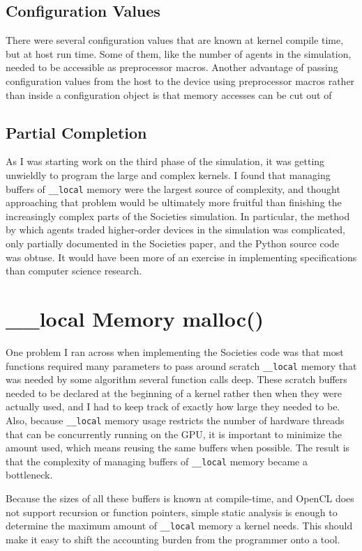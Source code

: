 \documentclass{article}
\begin{document}
\subsection{Configuration Values}
There were several configuration values that are known at kernel compile time, but at host run time. Some of them, like the number of agents in the simulation, needed to be accessible as preprocessor macros. Another advantage of passing configuration values from the host to the device using preprocessor macros rather than inside a configuration object is that memory accesses can be cut out of 

\subsection{Partial Completion}
As I was starting work on the third phase of the simulation, it was getting unwieldly to program the large and complex kernels. I found that managing buffers of \texttt{\_\_local} memory were the largest source of complexity, and thought approaching that problem would be ultimately more fruitful than finishing the increasingly complex parts of the Societies simulation. In particular, the method by which agents traded higher-order devices in the simulation was complicated, only partially documented in the Societies paper, and the Python source code was obtuse. It would have been more of an exercise in implementing specifications than computer science research.

\section{\_\_local Memory malloc()}
One problem I ran across when implementing the Societies code was that most functions required many parameters to pass around scratch \texttt{\_\_local} memory that was needed by some algorithm several function calls deep. These scratch buffers needed to be declared at the beginning of a kernel rather then when they were actually used, and I had to keep track of exactly how large they needed to be. Also, because \texttt{\_\_local} memory usage restricts the number of hardware threads that can be concurrently running on the GPU, it is important to minimize the amount used, which means reusing the same buffers when possible. The result is that the complexity of managing buffers of \texttt{\_\_local} memory became a bottleneck.

Because the sizes of all these buffers is known at compile-time, and OpenCL does not support recursion or function pointers, simple static analysis is enough to determine the maximum amount of \texttt{\_\_local} memory a kernel needs. This should make it easy to shift the accounting burden from the programmer onto a tool.
\end{document}
